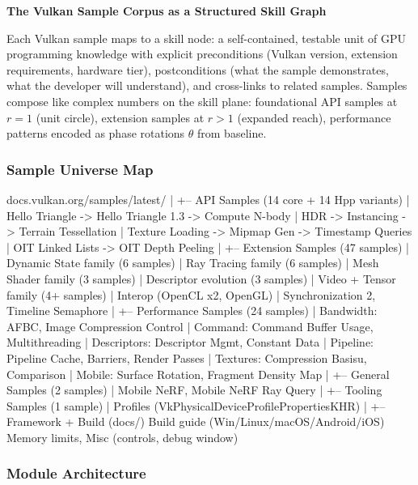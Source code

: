 \documentclass[11pt,letterpaper]{article}
\begin{document}
\textbf{The Vulkan Sample Corpus as a Structured Skill Graph}

Each Vulkan sample maps to a skill node: a self-contained, testable unit of GPU programming knowledge with explicit preconditions (Vulkan version, extension requirements, hardware tier), postconditions (what the sample demonstrates, what the developer will understand), and cross-links to related samples. Samples compose like complex numbers on the skill plane: foundational API samples at $r=1$ (unit circle), extension samples at $r > 1$ (expanded reach), performance patterns encoded as phase rotations $\theta$ from baseline.

\subsubsection{Sample Universe Map}

\begin{asciibox}
docs.vulkan.org/samples/latest/
|
+-- API Samples (14 core + 14 Hpp variants)
|    Hello Triangle -> Hello Triangle 1.3 -> Compute N-body
|    HDR -> Instancing -> Terrain Tessellation
|    Texture Loading -> Mipmap Gen -> Timestamp Queries
|    OIT Linked Lists -> OIT Depth Peeling
|
+-- Extension Samples (47 samples)
|    Dynamic State family (6 samples)
|    Ray Tracing family (6 samples)
|    Mesh Shader family (3 samples)
|    Descriptor evolution (3 samples)
|    Video + Tensor family (4+ samples)
|    Interop (OpenCL x2, OpenGL)
|    Synchronization 2, Timeline Semaphore
|
+-- Performance Samples (24 samples)
|    Bandwidth: AFBC, Image Compression Control
|    Command: Command Buffer Usage, Multithreading
|    Descriptors: Descriptor Mgmt, Constant Data
|    Pipeline: Pipeline Cache, Barriers, Render Passes
|    Textures: Compression Basisu, Comparison
|    Mobile: Surface Rotation, Fragment Density Map
|
+-- General Samples (2 samples)
|    Mobile NeRF, Mobile NeRF Ray Query
|
+-- Tooling Samples (1 sample)
|    Profiles (VkPhysicalDeviceProfilePropertiesKHR)
|
+-- Framework + Build (docs/)
     Build guide (Win/Linux/macOS/Android/iOS)
     Memory limits, Misc (controls, debug window)
\end{asciibox}

\subsubsection{Module Architecture}
\end{document}

